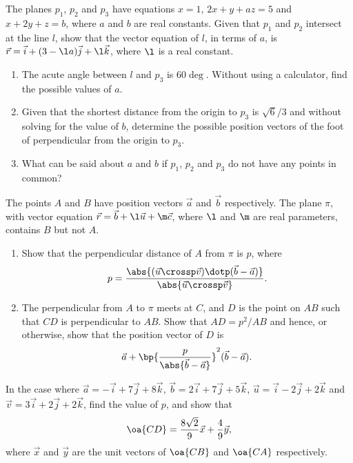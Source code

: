 \begin{problem}
    The planes $p_1$, $p_2$ and $p_3$ have equations $x = 1$, $2x + y + az = 5$ and $x + 2y + z = b$, where $a$ and $b$ are real constants. Given that $p_1$ and $p_2$ intersect at the line $l$, show that the vector equation of $l$, in terms of $a$, is $\vec r = \vec i + (3 - \l a)\vec j + \l \vec k$, where $\l$ is a real constant.

    \begin{enumerate}
        \item The acute angle between $l$ and $p_3$ is $60\deg$. Without using a calculator, find the possible values of $a$.
        \item Given that the shortest distance from the origin to $p_3$ is $\sqrt6 / 3$ and without solving for the value of $b$, determine the possible position vectors of the foot of perpendicular from the origin to $p_3$.
        \item What can be said about $a$ and $b$ if $p_1$, $p_2$ and $p_3$ do not have any points in common?
    \end{enumerate}
\end{problem}

\begin{problem}[\chili]
    The points $A$ and $B$ have position vectors $\vec a$ and $\vec b$ respectively. The plane $\pi$, with vector equation $\vec r = \vec b + \l \vec u + \m \vec c$, where $\l$ and $\m$ are real parameters, contains $B$ but not $A$.

    \begin{enumerate}
        \item Show that the perpendicular distance of $A$ from $\pi$ is $p$, where \[p = \frac{\abs{(\vec u \crossp \vec v) \dotp (\vec b - \vec a)}}{\abs{\vec u \crossp \vec v}}.\]
        \item The perpendicular from $A$ to $\pi$ meets at $C$, and $D$ is the point on $AB$ such that $CD$ is perpendicular to $AB$. Show that $AD = p^2 / AB$ and hence, or otherwise, show that the position vector of $D$ is \[\vec a + \bp{\frac{p}{\abs{\vec b - \vec a}}}^2 (\vec b - \vec a).\]
    \end{enumerate}

    In the case where $\vec a = -\vec i + 7\vec j + 8\vec k$, $\vec b = 2\vec i + 7\vec j + 5\vec k$, $\vec u = \vec i - 2\vec j + 2\vec k$ and $\vec v = 3\vec i + 2\vec j + 2\vec k$, find the value of $p$, and show that \[\oa{CD} = \frac{8\sqrt{2}}9 \vec x + \frac49 \vec y,\] where $\vec x$ and $\vec y$ are the unit vectors of $\oa{CB}$ and $\oa{CA}$ respectively.
\end{problem}